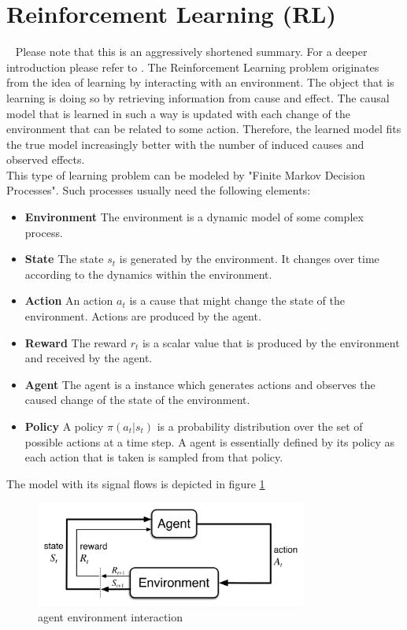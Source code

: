 \section{Reinforcement Learning (RL)}~\label{ssec:rl}
Please note that this is an aggressively shortened summary. For a deeper introduction please refer to \cite{SB_all}.
The Reinforcement Learning problem originates from the idea of learning by interacting with an environment. The object that is learning is doing so by retrieving information from cause and effect. The causal model that is learned in such a way is updated with each change of the environment that can be related to some action. Therefore, the learned model fits the true model increasingly better with the number of induced causes and observed effects.\\
This type of learning problem can be modeled by "Finite Markov Decision Processes". Such processes usually need the following elements:\\

\begin{itemize}
	\item \textbf{Environment} The environment is a dynamic model of some complex process.
	\item \textbf{State} The state $s_t$ is generated by the environment. It changes over time according to the dynamics within the environment.
	\item \textbf{Action} An action $a_t$ is a cause that might change the state of the environment. Actions are produced by the agent.
	\item \textbf{Reward} The reward $r_t$ is a scalar value that is produced by the environment and received by the agent.
	\item \textbf{Agent} The agent is a instance which generates actions and observes the caused change of the state of the environment.
	\item \textbf{Policy} A policy $\pi(a_t|s_t)$ is a probability distribution over the set of possible actions at a time step. A agent is essentially defined by its policy as each action that is taken is sampled from that policy.
\end{itemize}

The model with its signal flows is depicted in figure \ref{fig_rl_gen}

\begin{figure}
	\centering
	\includegraphics[width=0.8\textwidth]{figures/rl/agent_env_interface}
	\caption{agent environment interaction \cite{SB_all}}
	\label{fig_rl_gen}
\end{figure}

